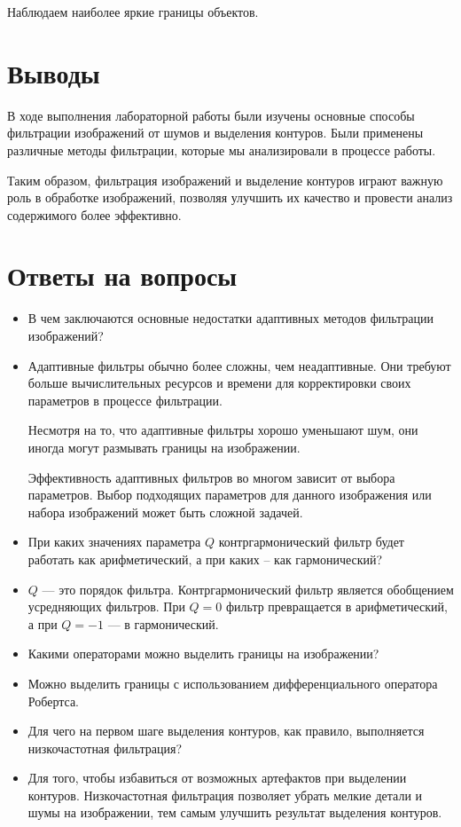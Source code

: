 Наблюдаем наиболее яркие границы объектов. 

\section{Выводы}


В ходе выполнения лабораторной работы были изучены основные способы фильтрации изображений от шумов и выделения контуров. Были применены различные методы фильтрации, которые мы анализировали в процессе работы.

Таким образом, фильтрация изображений и выделение контуров играют важную роль в обработке изображений, позволяя улучшить их качество и провести анализ содержимого более эффективно.

\section{Ответы на вопросы}

\setcounter{question}{0}

\newcommand{\question}[1]{\item[Q\refstepcounter{question}\thequestion.] #1}
\newcommand{\answer}[1]{\item[A\thequestion.] #1}

\begin{itemize}

\question{В чем заключаются основные недостатки адаптивных методов фильтрации изображений?}
\answer{Адаптивные фильтры обычно более сложны, чем неадаптивные. Они требуют больше вычислительных ресурсов и времени для корректировки своих параметров в процессе фильтрации. 

Несмотря на то, что адаптивные фильтры хорошо уменьшают шум, они иногда могут размывать границы на изображении. 

Эффективность адаптивных фильтров во многом зависит от выбора параметров. Выбор подходящих параметров для данного изображения или набора изображений может быть сложной задачей.

}

\question{При каких значениях параметра $Q$ контргармонический фильтр будет работать как арифметический, а при каких -- как гармонический?}
\answer{$Q$ — это порядок фильтра. Контргармонический фильтр является обобщением усредняющих фильтров. При $Q = 0$ фильтр превращается в арифметический, а при $Q = -1$ — в гармонический.}

\question{Какими операторами можно выделить границы на изображении?}
\answer{Можно выделить границы с использованием дифференциального оператора
Робертса.}

\question{Для чего на первом шаге выделения контуров, как правило, выполняется низкочастотная фильтрация?}
\answer{Для того, чтобы избавиться от возможных артефактов при выделении контуров. Низкочастотная фильтрация позволяет убрать мелкие детали и шумы на изображении, тем самым улучшить результат выделения контуров.}

\end{itemize}
